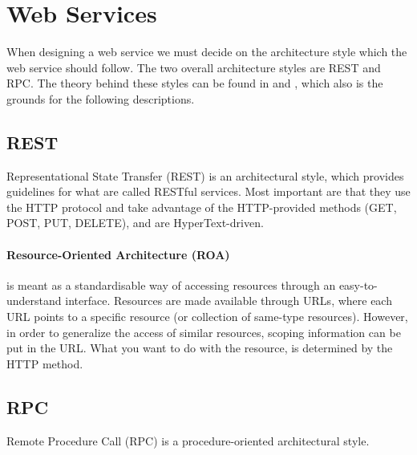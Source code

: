 \section{Web Services}
When designing a web service we must decide on the architecture style which the web service should follow.
The two overall architecture styles are REST and RPC. The theory behind these styles can be found in \citet{restful_web_services} and \citet{fielding_dissertation}, which also is the grounds for the following descriptions.


\subsection{REST}
Representational State Transfer (REST) is an architectural style, which provides guidelines for what are called RESTful services.
Most important are that they use the HTTP\cite{http_specification} protocol and take advantage of the HTTP-provided methods (GET, POST, PUT, DELETE), and are HyperText-driven.


\paragraph{Resource-Oriented Architecture (ROA)} is meant as a standardisable way of accessing resources through an easy-to-understand interface.
Resources are made available through URLs, where each URL points to a specific resource (or collection of same-type resources).
However, in order to generalize the access of similar resources, scoping information can be put in the URL.
What you want to do with the resource, is determined by the HTTP method.

\subsection{RPC}
Remote Procedure Call (RPC) is a procedure-oriented architectural style.

